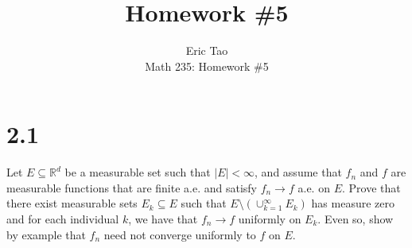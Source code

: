 \documentclass[10pt]{article}
\newenvironment{problem}[2][Problem]{\begin{trivlist}
\item[\hskip \labelsep {\bfseries #1}\hskip \labelsep {\bfseries #2.}]}{\end{trivlist}}
\begin{document}
 
\title{Homework \#5}
\author{Eric Tao\\
Math 235: Homework \#5}
\maketitle
 
\section*{2.1}

\begin{problem}{3.4.7}
Let $E \subseteq \mathbb{R}^d$ be a measurable set such that $|E| < \infty$, and assume that $f_n$ and $f$ are measurable functions that are finite a.e. and satisfy $f_n \to f$ a.e. on $E$. Prove that there exist measurable sets $E_k \subseteq E$ such that $E \setminus (\cup_{k=1}^\infty E_k)$ has measure zero and for each individual $k$, we have that $f_n \to f$ uniformly on $E_k$. Even so, show by example that $f_n$ need not converge uniformly to $f$ on $E$.
\end{problem}
\end{document}
